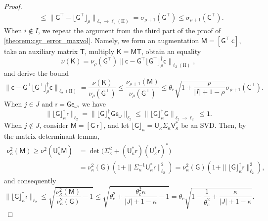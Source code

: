 \documentclass[10pt,a4paper]{amsart}
\newcommand{\Batrix}[1]{\bm{\Matrix{#1}}}
\newcommand{\Hilb}{\mathrm{H}}
\newcommand{\Index}[1]{{#1}}
\newcommand{\Matrix}[1]{\mathsf{#1}}
\newcommand{\Norm}[3][]{#1\| #2 #1\|_{\mathrm{#3}}}
\newcommand{\pinv}{\dagger}
\newcommand{\trans}{\intercal}
\newcommand{\truncate}[3][]{#1\lfloor #2 #1\rfloor_{#3}}
\begin{document}
\begin{proof}
\begin{align*}
    &\leq \Norm{\Batrix{G}^\trans - \truncate{\Batrix{G}^\trans}{\rho}}{\ell_2 \to \ell_2(\Hilb)} = \sigma_{\rho + 1}(\Batrix{G}^\trans) \leq \sigma_{\rho + 1}(\Batrix{C}^\trans).
\end{align*}
When $i \not\in \Index{I}$, we repeat the argument from the third part of the proof of \cref{theorem:cgr_error_maxvol}.
Namely, we form an augmentation $\Batrix{M} = [\Batrix{G}^\trans~\Batrix{c}]$, take an auxiliary matrix $\Matrix{T}$, multiply $\Batrix{K} = \Batrix{M} \Matrix{T}$, obtain an equality
\begin{equation*}
    \nu(\Batrix{K}) = \nu_{\rho}(\Batrix{G}^{\trans}) \Norm{\Batrix{c} - \Batrix{G}^\trans \truncate{\Batrix{G}^\trans}{\rho}^\pinv \Batrix{c}}{\ell_2(\Hilb)},
\end{equation*}
and derive the bound
\begin{equation*}
   \Norm{\Batrix{c} - \Batrix{G}^\trans \truncate{\Batrix{G}^\trans}{\rho}^\pinv \Batrix{c}}{\ell_2(\Hilb)} = \frac{\nu(\Batrix{K})}{\nu_{\rho}(\Batrix{G}^{\trans})} \leq \frac{\nu_{\rho + 1}(\Batrix{M})}{\nu_{\rho}(\Batrix{G}^{\trans})} \leq  \theta_r \sqrt{1 + \frac{\rho}{|\Index{I}| + 1 - \rho}} \sigma_{\rho + 1}(\Batrix{C}^\trans).
\end{equation*}
When $j \in \Index{J}$ and $\Batrix{r} = \Batrix{G} \Matrix{e}_{\omega}$, we have
\begin{equation*}
    \Norm{\truncate{\Batrix{G}}{\kappa}^\pinv \Batrix{r}}{\ell_2} = \Norm{\truncate{\Batrix{G}}{\kappa}^\pinv \Batrix{G} \Matrix{e}_{\omega}}{\ell_2} \leq \Norm{\truncate{\Batrix{G}}{\kappa}^\pinv \Batrix{G}}{\ell_2 \to \ell_2} \leq 1.
\end{equation*}
When $j \not\in \Index{J}$, consider $\Batrix{M} = [\Batrix{G}~\Batrix{r}]$, and let $\truncate{\Batrix{G}}{\kappa} = \Batrix{U}_\kappa \Matrix{\Sigma}_\kappa \Matrix{V}_\kappa^\ast$ be an SVD.
Then, by the matrix determinant lemma,
\begin{align*}
    \nu_\kappa^2(\Batrix{M}) \geq \nu^2(\Batrix{U}_\kappa^\ast \Batrix{M}) &= \det\Big( \Matrix{\Sigma}_\kappa^2 + (\Batrix{U}_\kappa^\ast \Batrix{r}) (\Batrix{U}_\kappa^\ast \Batrix{r})^\ast \Big) \\
    &= \nu_\kappa^2(\Batrix{G}) (1 + \Norm{\Matrix{\Sigma}_\kappa^{-1} \Batrix{U}_\kappa^\ast \Batrix{r}}{\ell_2}^2) = \nu_\kappa^2(\Batrix{G}) (1 + \Norm{\truncate{\Batrix{G}}{\kappa}^\pinv \Batrix{r}}{\ell_2}^2),
\end{align*}
and consequently
\begin{equation*}
    \Norm{\truncate{\Batrix{G}}{\kappa}^\pinv \Batrix{r}}{\ell_2} \leq \sqrt{\frac{\nu_\kappa^2(\Batrix{M})}{\nu_\kappa^2(\Batrix{G})} - 1} \leq \sqrt{\theta_c^2 + \frac{\theta_c^2 \kappa}{|\Index{J}| + 1 - \kappa} - 1} = \theta_c \sqrt{1 - \frac{1}{\theta_c^2} + \frac{\kappa}{|\Index{J}| + 1 - \kappa}}.
\end{equation*}
\end{proof}
\end{document}
